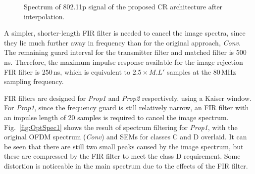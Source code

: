 \begin{figure}
	\centering
	\vspace{-2mm}
\caption{Spectrum of 802.11p signal of the proposed CR architecture after interpolation.}
\label{fig:OverSpec}
\end{figure}

A simpler, shorter-length FIR filter is needed to cancel the image spectra, since they lie much further away in frequency than for the original approach, \emph{Conv}.
The remaining guard interval for the transmitter filter and matched filter is 500\,ns.
Therefore, the maximum impulse response available for the image rejection FIR filter is 250\,ns, which is equivalent to $2.5 \times M.L'$ samples at the 80\,MHz sampling frequency.

FIR filters are designed for \emph{Prop1} and \emph{Prop2} respectively, using a Kaiser window. For \emph{Prop1}, since the frequency guard is still relatively narrow, an FIR filter with an impulse length of 20 samples is required to cancel the image spectrum.
Fig.~\ref{fig:OptSpec1} shows the result of spectrum filtering for \emph{Prop1}, with the original OFDM spectrum (\emph{Conv}) and SEMs for classes C and D overlaid.
It can be seen that there are still two small peaks caused by the image spectrum, but these are compressed by the FIR filter to meet the class D requirement.
Some distortion is noticeable in the main spectrum due to the effects of the FIR filter.

